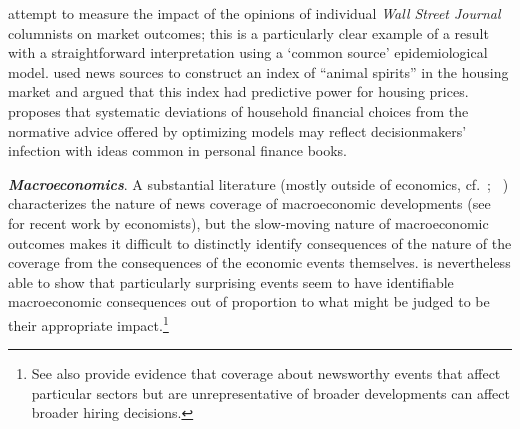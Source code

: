  attempt to measure the impact of the opinions of individual \textit{Wall Street Journal} columnists on market outcomes; this is a particularly clear example of a result with a straightforward interpretation using a `common source' epidemiological model. %
 used news sources to construct an index of ``animal spirits'' in the housing market and argued that this index had predictive power for housing prices.  \cite{choi2022popular} proposes that systematic deviations of household financial choices from the normative advice offered by optimizing models may reflect decisionmakers' infection with ideas common in personal finance books.%

\textbf{\textit{Macroeconomics}}. A substantial literature (mostly outside of economics, cf.~\cite{soroka2015s}; ~\cite{damstra2021economy}) characterizes the nature of news coverage of macroeconomic developments (see  \cite{bybee2020structure} for recent work by economists), but the slow-moving nature of macroeconomic outcomes makes it difficult to distinctly identify consequences of the nature of the coverage from the consequences of the economic events themselves.  \cite{nimark2014man} is nevertheless able to show that particularly surprising events seem to have identifiable macroeconomic consequences out of proportion to what might be judged to be their appropriate impact.\footnote{See also \cite{chahrour2021sectoral} provide evidence that coverage about newsworthy events that affect particular sectors but are unrepresentative of broader developments can affect broader hiring decisions.}

